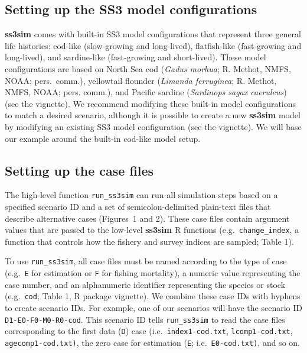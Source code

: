 \documentclass[10pt]{article}
\begin{document}
\subsection*{Setting up the SS3 model configurations}

\textbf{ss3sim} comes with built-in SS3 model configurations that represent
three general life histories: cod-like (slow-growing and long-lived),
flatfish-like (fast-growing and long-lived), and sardine-like (fast-growing and
short-lived). These model configurations are based on North Sea cod
(\emph{Gadus morhua}; R. Methot, NMFS, NOAA; pers.~comm.), yellowtail flounder
(\emph{Limanda ferruginea}; R. Methot, NMFS, NOAA; pers. comm.), and Pacific
sardine (\emph{Sardinops sagax caeruleus}) \cite{hill2012} (see the vignette). We
recommend modifying these built-in model configurations to match a desired
scenario, although it is possible to create a new \textbf{ss3sim} model by
modifying an existing SS3 model configuration (see the vignette). We will base our
example around the built-in cod-like model setup.

\subsection*{Setting up the case files}

The high-level function \texttt{run\_ss3sim} can run all simulation steps based
on a specified scenario ID and a set of semicolon-delimited plain-text files
that describe alternative cases (Figures~1 and 2). These case files
contain argument values that are passed to the low-level \textbf{ss3sim}
\textsf{R} functions (e.g.~\texttt{change\_index}, a function that controls how
the fishery and survey indices are sampled; Table 1).

To use \texttt{run\_ss3sim}, all case files must be named according to the type
of case (e.g.~\texttt{E} for estimation or \texttt{F} for fishing mortality), a
numeric value representing the case number, and an alphanumeric identifier
representing the species or stock (e.g.~\texttt{cod}; Table 1, \textsf{R} package vignette). We
combine these case IDs with hyphens to create scenario IDs. For example, one of
our scenarios will have the scenario ID \texttt{D1-E0-F0-M0-R0-cod}. This
scenario ID tells \texttt{run\_ss3sim} to read the case files corresponding to
the first data (\texttt{D}) case (i.e.~\texttt{index1-cod.txt},
\texttt{lcomp1-cod.txt}, \texttt{agecomp1-cod.txt)}, the zero case for
estimation (\texttt{E}; i.e.~\texttt{E0-cod.txt)}, and so on.
\end{document}

